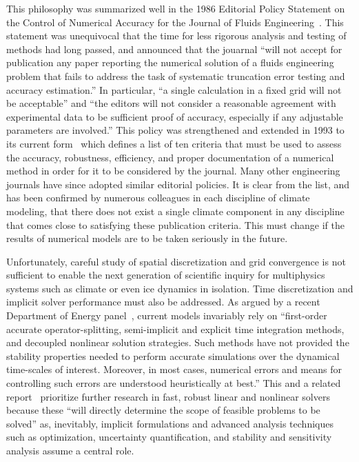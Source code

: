 This philosophy was summarized well in the 1986 Editorial Policy Statement on the Control of Numerical Accuracy for the Journal of Fluids Engineering~\citep{roache1986editorial}.
This statement was unequivocal that the time for less rigorous analysis and testing of methods had long passed, and announced that the jouarnal ``will not accept for publication any paper reporting the numerical solution of a fluids engineering problem that fails to address the task of systematic truncation error testing and accuracy estimation.''
In particular, ``a single calculation in a fixed grid will not be acceptable'' and ``the editors will not consider a reasonable agreement with experimental data to be sufficient proof of accuracy, especially if any adjustable parameters are involved.''
This policy was strengthened and extended in 1993 to its current form~\citep{jfe2004numaccuracy} which defines a list of ten criteria that must be used to assess the accuracy, robustness, efficiency, and proper documentation of a numerical method in order for it to be considered by the journal.
Many other engineering journals have since adopted similar editorial policies.
It is clear from the list, and has been confirmed by numerous colleagues in each discipline of climate modeling, that there does not exist a single climate component in any discipline that comes close to satisfying these publication criteria.
This must change if the results of numerical models are to be taken seriously in the future.

Unfortunately, careful study of spatial discretization and grid convergence is not sufficient to enable the next generation of scientific inquiry for multiphysics systems such as climate or even ice dynamics in isolation.
Time discretization and implicit solver performance must also be addressed.
As argued by a recent Department of Energy panel~\citep{simon2007modeling}, current models invariably rely on ``first-order accurate operator-splitting, semi-implicit and explicit time integration methods, and decoupled nonlinear solution strategies.
Such methods have not provided the stability properties needed to perform accurate simulations over the dynamical time-scales of interest.
Moreover, in most cases, numerical errors and means for controlling such errors are understood heuristically at best.''
This and a related report~\citep{washington2009scientific} prioritize further research in fast, robust linear and nonlinear solvers because these ``will directly determine the scope of feasible problems to be solved'' as, inevitably, implicit formulations and advanced analysis techniques such as optimization, uncertainty quantification, and stability and sensitivity analysis assume a central role.

